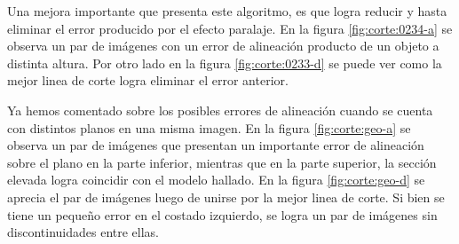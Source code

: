Una mejora importante que presenta este algoritmo, es que logra reducir y hasta eliminar el error producido por el efecto paralaje. En la figura \ref{fig:corte:0234-a} se observa un par de imágenes con un error de alineación producto de un objeto a distinta altura. Por otro lado en la figura \ref{fig:corte:0233-d} se puede ver como la mejor linea de corte logra eliminar el error anterior.

\begin{figure}[H]
	\centering     %
	\hspace{0.05\textwidth}%
	
	
	\caption[Ejemplo de fusión pirámidal]{}
	\label{imagen:cut:0234}
\end{figure}

Ya hemos comentado sobre los posibles errores de alineación cuando se cuenta con distintos planos en una misma imagen. En la figura \ref{fig:corte:geo-a} se observa un par de imágenes que presentan un importante error de alineación sobre el plano en la parte inferior, mientras que en la parte superior, la sección elevada logra coincidir con el modelo hallado. En la figura \ref{fig:corte:geo-d} se aprecia el par de imágenes luego de unirse por la mejor linea de corte. Si bien se tiene un pequeño error en el costado izquierdo, se logra un par de imágenes sin discontinuidades entre ellas.

\begin{figure}[H]
	\centering     %
	\hspace{0.1\textwidth}%
	
	
	\caption[Ejemplo de fusión pirámidal]{}
	\label{imagen:cut:geo}
\end{figure}

